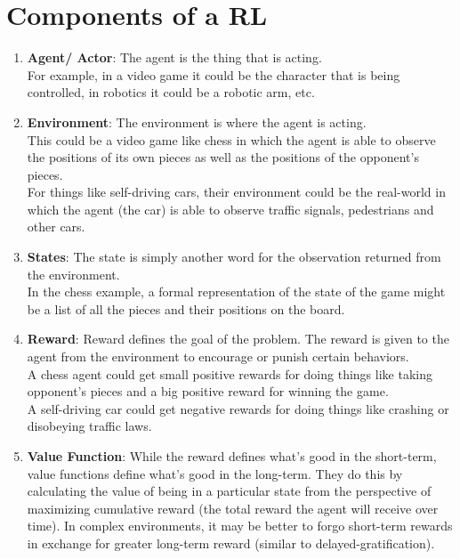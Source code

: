 \section{Components of a RL \cite{medium-numsmt2-rl-ch1-part-1}}\label{Components of a RL}
\begin{enumerate}[itemsep=5pt]
    \item \textbf{Agent/ Actor}: The agent is the thing that is acting.\\ For example, in a video game it could be the character that is being controlled, in robotics it could be a robotic arm, etc.
    
    \item \textbf{Environment}: The environment is where the agent is acting. \\ This could be a video game like chess in which the agent is able to observe the positions of its own pieces as well as the positions of the opponent’s pieces. \\ For things like self-driving cars, their environment could be the real-world in which the agent (the car) is able to observe traffic signals, pedestrians and other cars.
    
    \item \textbf{States}: The state is simply another word for the observation returned from the environment. \\ In the chess example, a formal representation of the state of the game might be a list of all the pieces and their positions on the board.
    
    \item \textbf{Reward}: Reward defines the goal of the problem. The reward is given to the agent from the environment to encourage or punish certain behaviors. \\ A chess agent could get small positive rewards for doing things like taking opponent’s pieces and a big positive reward for winning the game. \\ A self-driving car could get negative rewards for doing things like crashing or disobeying traffic laws.

    \item \textbf{Value Function}: While the reward defines what’s good in the short-term, value functions define what’s good in the long-term. They do this by calculating the value of being in a particular state from the perspective of maximizing cumulative reward (the total reward the agent will receive over time). In complex environments, it may be better to forgo short-term rewards in exchange for greater long-term reward (similar to delayed-gratification).


\end{enumerate}
